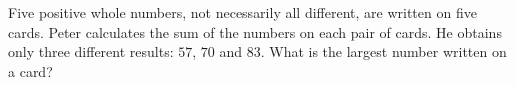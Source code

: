Five positive whole numbers, not necessarily all different, are written on five cards. Peter calculates the sum of the numbers on each pair of cards. He obtains only three different results: $57$, $70$ and $83$. What is the largest number written on a card?
